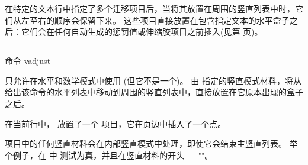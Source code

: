 \documentclass{book}
\begin{document}
在特定的文本行中指定了多个迁移项目后，当将其放置在周围的竖直列表中时，它们从左至右的顺序会保留下来。
这些项目直接放置在包含指定文本的水平盒子之后：它们会在任何自动生成的惩罚值或伸缩胶项目之前插入(见第 \pageref{between:lines} 页)。

\subsection{}

命令 
\cstoidx vadjust\par
\begin{disp}\lb{}\rb\end{disp}
只允许在水平和数学模式中使用 (但它不是一个)。
由  指定的竖直模式材料，将从给出该命令的水平列表中移动到周围的竖直列表中，直接放置在它原本出现的盒子之后。

在当前行中，
放置了一个  项目，它在页边中插入了一个点。


{} 项目中的任何竖直材料会在内部竖直模式中处理，即使它会结束主竖直列表。
举个例子，在  中  测试为真，并且在竖直材料的开头
\mdqon
{}$=$""\n{-1000pt}。
\mdqoff
\end{document}
